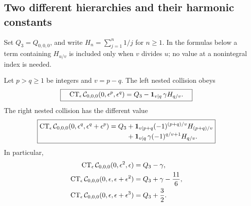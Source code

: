 \subsection{Two different hierarchies and their harmonic constants}

Set $Q_3=Q_{0,0,0}$, and write $H_n=\sum_{j=1}^n1/j$ for $n\ge1$.
In the formulas below a term containing $H_{u/v}$ is included only
when $v$ divides $u$; no value at a nonintegral index is needed.

\begin{theorem}\label{hc:hierarchy}
Let $p>q\ge1$ be integers and $v=p-q$. The left nested collision obeys
\begin{equation}\label{hc:left}
 \boxed{\quad
 \operatorname{CT}_{\epsilon}\mathcal C_{0,0,0}(0,\epsilon^p,\epsilon^q)
   =Q_3-\mathbf1_{v\mid q}\,\gamma H_{q/v}.
 \quad}
\end{equation}
The right nested collision has the different value
\begin{equation}
 \boxed{\begin{aligned}
 \operatorname{CT}_{\epsilon}\mathcal C_{0,0,0}
           (0,\epsilon^q,\epsilon^q+\epsilon^p)
 =Q_3
 &+\mathbf1_{v\mid p+q}(-1)^{(p+q)/v}H_{(p+q)/v}
 \\[-2pt]
 &+\mathbf1_{v\mid q}\,\gamma(-1)^{q/v+1}H_{q/v}.
 \end{aligned}}\label{hc:right}
\end{equation}
In particular,
\begin{align}
 \operatorname{CT}_{\epsilon}\mathcal C_{0,0,0}(0,\epsilon^2,\epsilon)
     &=Q_3-\gamma,\label{hc:left-example}\\
 \operatorname{CT}_{\epsilon}\mathcal C_{0,0,0}(0,\epsilon,\epsilon+\epsilon^2)
     &=Q_3+\gamma-\frac{11}{6},\label{hc:right-example}\\
 \operatorname{CT}_{\epsilon}\mathcal C_{0,0,0}(0,\epsilon,\epsilon+\epsilon^3)
     &=Q_3+\frac32.\label{hc:right-second}
\end{align}
\end{theorem}

